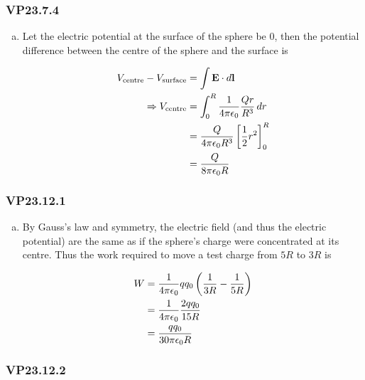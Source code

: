 \documentclass{article}
\begin{document}
\subsubsection{VP23.7.4}

\begin{enumerate}[a)]
  \item Let the electric potential at the surface of the sphere be $0$, then the potential difference between the centre of the sphere and the surface is

        \begin{align*}
          V_\textrm{centre} - V_\textrm{surface} & = \int \mathbf{E} \cdot d\mathbf{l}                                 \\
          \Rightarrow V_\textrm{centre}          & = \int_0^R \frac{1}{4 \pi \epsilon_0} \frac{Q r}{R^3} \,dr                                 \\
                                                 & = \frac{Q}{4 \pi \epsilon_0 R^3} \left[ \frac{1}{2} r^2 \right]_0^R \\
                                                 & = \frac{Q}{8 \pi \epsilon_0 R}
        \end{align*}
\end{enumerate}

\subsubsection{VP23.12.1}

\begin{enumerate}[a)]
  \item By Gauss's law and symmetry, the electric field (and thus the electric potential) are the same as if the sphere's charge were concentrated at its centre. Thus the work required to move a test charge from $5R$ to $3R$ is

        \begin{align*}
          W & = \frac{1}{4 \pi \epsilon_0} q q_0 \left( \frac{1}{3 R} - \frac{1}{5 R} \right) \\
            & = \frac{1}{4 \pi \epsilon_0} \frac{2 q q_0}{15 R}                               \\
            & = \frac{q q_0}{30 \pi \epsilon_0 R}
        \end{align*}
\end{enumerate}

\subsubsection{VP23.12.2}
\end{document}
